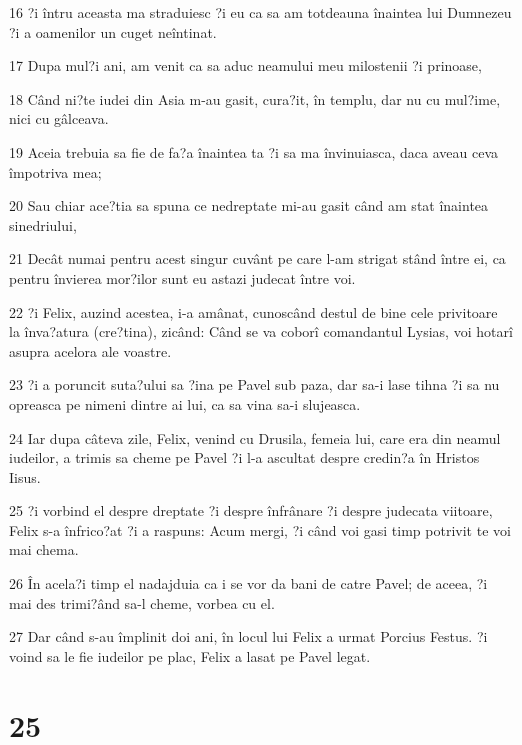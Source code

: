 \par 16 ?i întru aceasta ma straduiesc ?i eu ca sa am totdeauna înaintea lui Dumnezeu ?i a oamenilor un cuget neîntinat.
\par 17 Dupa mul?i ani, am venit ca sa aduc neamului meu milostenii ?i prinoase,
\par 18 Când ni?te iudei din Asia m-au gasit, cura?it, în templu, dar nu cu mul?ime, nici cu gâlceava.
\par 19 Aceia trebuia sa fie de fa?a înaintea ta ?i sa ma învinuiasca, daca aveau ceva împotriva mea;
\par 20 Sau chiar ace?tia sa spuna ce nedreptate mi-au gasit când am stat înaintea sinedriului,
\par 21 Decât numai pentru acest singur cuvânt pe care l-am strigat stând între ei, ca pentru învierea mor?ilor sunt eu astazi judecat între voi.
\par 22 ?i Felix, auzind acestea, i-a amânat, cunoscând destul de bine cele privitoare la înva?atura (cre?tina), zicând: Când se va coborî comandantul Lysias, voi hotarî asupra acelora ale voastre.
\par 23 ?i a poruncit suta?ului sa ?ina pe Pavel sub paza, dar sa-i lase tihna ?i sa nu opreasca pe nimeni dintre ai lui, ca sa vina sa-i slujeasca.
\par 24 Iar dupa câteva zile, Felix, venind cu Drusila, femeia lui, care era din neamul iudeilor, a trimis sa cheme pe Pavel ?i l-a ascultat despre credin?a în Hristos Iisus.
\par 25 ?i vorbind el despre dreptate ?i despre înfrânare ?i despre judecata viitoare, Felix s-a înfrico?at ?i a raspuns: Acum mergi, ?i când voi gasi timp potrivit te voi mai chema.
\par 26 În acela?i timp el nadajduia ca i se vor da bani de catre Pavel; de aceea, ?i mai des trimi?ând sa-l cheme, vorbea cu el.
\par 27 Dar când s-au împlinit doi ani, în locul lui Felix a urmat Porcius Festus. ?i voind sa le fie iudeilor pe plac, Felix a lasat pe Pavel legat.

\chapter{25}

